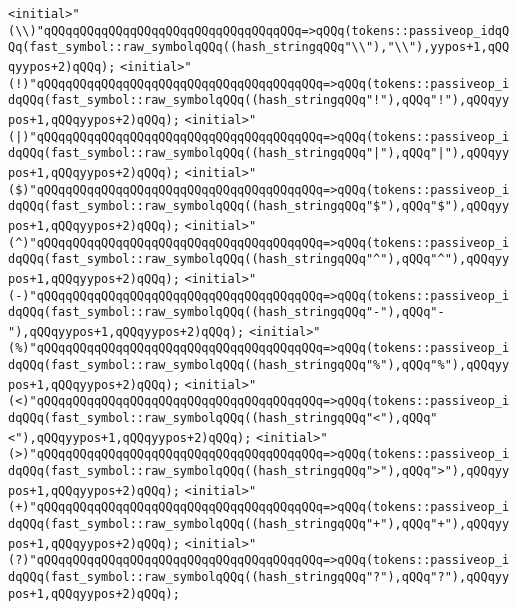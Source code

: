 \verb|<initial>"(\\)"qQQqqQQqqQQqqQQqqQQqqQQqqQQqqQQqqQQq=>qQQq(tokens::passiveop_idqQQq(fast_symbol::raw_symbolqQQq((hash_stringqQQq"\\"),"\\"),yypos+1,qQQqyypos+2)qQQq);|\newline
\verb|<initial>"(!)"qQQqqQQqqQQqqQQqqQQqqQQqqQQqqQQqqQQqqQQq=>qQQq(tokens::passiveop_idqQQq(fast_symbol::raw_symbolqQQq((hash_stringqQQq"!"),qQQq"!"),qQQqyypos+1,qQQqyypos+2)qQQq);|\newline
\verb|<initial>"(|\verb#|)"qQQqqQQqqQQqqQQqqQQqqQQqqQQqqQQqqQQqqQQq=>qQQq(tokens::passiveop_idqQQq(fast_symbol::raw_symbolqQQq((hash_stringqQQq"|"),qQQq"|"),qQQqyypos+1,qQQqyypos+2)qQQq);#\newline
\verb|<initial>"($)"qQQqqQQqqQQqqQQqqQQqqQQqqQQqqQQqqQQqqQQq=>qQQq(tokens::passiveop_idqQQq(fast_symbol::raw_symbolqQQq((hash_stringqQQq"$"),qQQq"$"),qQQqyypos+1,qQQqyypos+2)qQQq);|\newline
\verb|<initial>"(^)"qQQqqQQqqQQqqQQqqQQqqQQqqQQqqQQqqQQqqQQq=>qQQq(tokens::passiveop_idqQQq(fast_symbol::raw_symbolqQQq((hash_stringqQQq"^"),qQQq"^"),qQQqyypos+1,qQQqyypos+2)qQQq);|\newline
\verb|<initial>"(-)"qQQqqQQqqQQqqQQqqQQqqQQqqQQqqQQqqQQqqQQq=>qQQq(tokens::passiveop_idqQQq(fast_symbol::raw_symbolqQQq((hash_stringqQQq"-"),qQQq"-"),qQQqyypos+1,qQQqyypos+2)qQQq);|\newline
\verb|<initial>"(%)"qQQqqQQqqQQqqQQqqQQqqQQqqQQqqQQqqQQqqQQq=>qQQq(tokens::passiveop_idqQQq(fast_symbol::raw_symbolqQQq((hash_stringqQQq"%"),qQQq"%"),qQQqyypos+1,qQQqyypos+2)qQQq);|\newline
\verb|<initial>"(<)"qQQqqQQqqQQqqQQqqQQqqQQqqQQqqQQqqQQqqQQq=>qQQq(tokens::passiveop_idqQQq(fast_symbol::raw_symbolqQQq((hash_stringqQQq"<"),qQQq"<"),qQQqyypos+1,qQQqyypos+2)qQQq);|\newline
\verb|<initial>"(>)"qQQqqQQqqQQqqQQqqQQqqQQqqQQqqQQqqQQqqQQq=>qQQq(tokens::passiveop_idqQQq(fast_symbol::raw_symbolqQQq((hash_stringqQQq">"),qQQq">"),qQQqyypos+1,qQQqyypos+2)qQQq);|\newline
\verb|<initial>"(+)"qQQqqQQqqQQqqQQqqQQqqQQqqQQqqQQqqQQqqQQq=>qQQq(tokens::passiveop_idqQQq(fast_symbol::raw_symbolqQQq((hash_stringqQQq"+"),qQQq"+"),qQQqyypos+1,qQQqyypos+2)qQQq);|\newline
\verb|<initial>"(?)"qQQqqQQqqQQqqQQqqQQqqQQqqQQqqQQqqQQqqQQq=>qQQq(tokens::passiveop_idqQQq(fast_symbol::raw_symbolqQQq((hash_stringqQQq"?"),qQQq"?"),qQQqyypos+1,qQQqyypos+2)qQQq);|\newline
